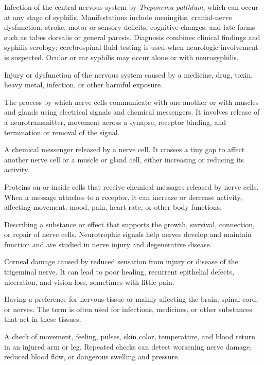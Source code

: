  Infection of the central nervous system by \textit{Treponema pallidum},
which can occur at any stage of syphilis. Manifestations include meningitis, cranial-nerve
dysfunction, stroke, motor or sensory deficits, cognitive changes, and late forms such as
tabes dorsalis or general paresis. Diagnosis combines clinical findings and syphilis
serology; cerebrospinal-fluid testing is used when neurologic involvement is suspected.
Ocular or ear syphilis may occur alone or with neurosyphilis.

 Injury or dysfunction of the nervous system caused by a medicine, drug, toxin, heavy metal, infection, or other harmful exposure.

 The process by which nerve cells communicate with one another or with muscles and glands using electrical signals and chemical messengers. It involves release of a neurotransmitter, movement across a synapse, receptor binding, and termination or removal of the signal.

 A chemical messenger released by a nerve cell. It crosses a tiny gap to affect another nerve cell or a muscle or gland cell, either increasing or reducing its activity.

 Proteins on or inside cells that receive chemical messages released by nerve cells. When a message attaches to a receptor, it can increase or decrease activity, affecting movement, mood, pain, heart rate, or other body functions.

 Describing a substance or effect that supports the growth, survival, connection, or repair of nerve cells. Neurotrophic signals help nerves develop and maintain function and are studied in nerve injury and degenerative disease.

 Corneal damage caused by reduced sensation from injury or disease of the trigeminal nerve. It can lead to poor healing, recurrent epithelial defects, ulceration, and vision loss, sometimes with little pain.

 Having a preference for nervous tissue or mainly affecting the brain, spinal cord, or nerves. The term is often used for infections, medicines, or other substances that act in these tissues.

 A check of movement, feeling, pulses, skin color, temperature, and blood return in an injured arm or leg. Repeated checks can detect worsening nerve damage, reduced blood flow, or dangerous swelling and pressure.

